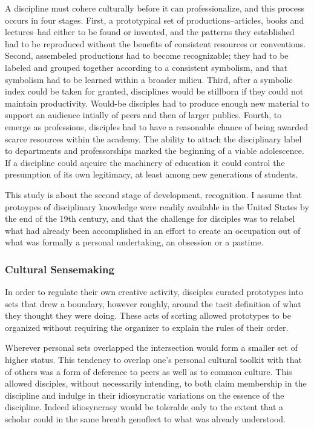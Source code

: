 \documentclass[]{article}
\begin{document}
A discipline must cohere culturally before it can professionalize, and
this process occurs in four stages. First, a prototypical set of
productions--articles, books and lectures--had either to be found or
invented, and the patterns they established had to be reproduced without
the benefits of consistent resources or conventions. Second, assembeled
productions had to become recognizable; they had to be labeled and
grouped together according to a consistent symbolism, and that symbolism
had to be learned within a broader milieu. Third, after a symbolic index
could be taken for granted, disciplines would be stillborn if they could
not maintain productivity. Would-be disciples had to produce enough new
material to support an audience intially of peers and then of larger
publics. Fourth, to emerge as professions, disciples had to have a
reasonable chance of being awarded scarce resources within the academy.
The ability to attach the disciplinary label to departments and
professorships marked the beginning of a viable adolescence. If a
discipline could aqcuire the machinery of education it could control the
presumption of its own legitimacy, at least among new generations of
students.



This study is about the second stage of development, recognition. I
assume that protoypes of disciplinary knowledge were readily available
in the United States by the end of the 19th century, and that the
challenge for disciples was to relabel what had already been
accomplished in an effort to create an occupation out of what was
formally a personal undertaking, an obsession or a pastime.

\subsubsection{Cultural Sensemaking}\label{cultural-sensemaking}

In order to regulate their own creative activity, disciples curated
prototypes into sets that drew a boundary, however roughly, around the
tacit definition of what they thought they were doing. These acts of
sorting allowed prototypes to be organized without requiring the
organizer to explain the rules of their order.

Wherever personal sets overlapped the intersection would form a smaller
set of higher status. This tendency to overlap one's personal cultural
toolkit with that of others was a form of deference to peers as well as
to common culture. This allowed disciples, without necessarily
intending, to both claim membership in the discipline and indulge in
their idiosyncratic variations on the essence of the discipline. Indeed
idiosyncrasy would be tolerable only to the extent that a scholar could
in the same breath genuflect to what was already understood.
\end{document}
